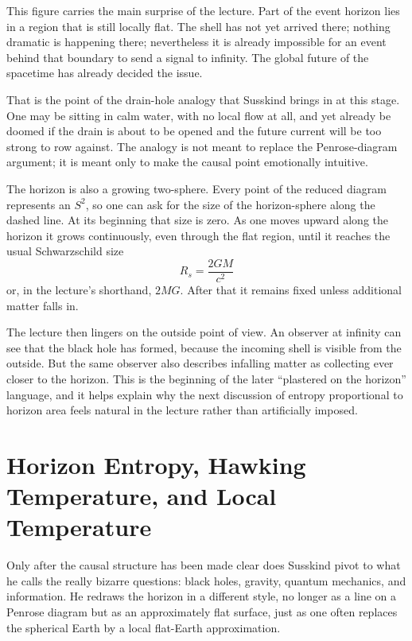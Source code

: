 This figure carries the main surprise of the lecture. Part of the event horizon lies in a region that is still locally flat. The shell has not yet arrived there; nothing dramatic is happening there; nevertheless it is already impossible for an event behind that boundary to send a signal to infinity. The global future of the spacetime has already decided the issue.

That is the point of the drain-hole analogy that Susskind brings in at this stage. One may be sitting in calm water, with no local flow at all, and yet already be doomed if the drain is about to be opened and the future current will be too strong to row against. The analogy is not meant to replace the Penrose-diagram argument; it is meant only to make the causal point emotionally intuitive.

The horizon is also a growing two-sphere. Every point of the reduced diagram represents an \(S^2\), so one can ask for the size of the horizon-sphere along the dashed line. At its beginning that size is zero. As one moves upward along the horizon it grows continuously, even through the flat region, until it reaches the usual Schwarzschild size
\begin{equation}
R_s=\frac{2GM}{c^2}
\end{equation}
or, in the lecture's shorthand, \(2MG\). After that it remains fixed unless additional matter falls in.

The lecture then lingers on the outside point of view. An observer at infinity can see that the black hole has formed, because the incoming shell is visible from the outside. But the same observer also describes infalling matter as collecting ever closer to the horizon. This is the beginning of the later ``plastered on the horizon'' language, and it helps explain why the next discussion of entropy proportional to horizon area feels natural in the lecture rather than artificially imposed.

\section{Horizon Entropy, Hawking Temperature, and Local Temperature}

Only after the causal structure has been made clear does Susskind pivot to what he calls the really bizarre questions: black holes, gravity, quantum mechanics, and information. He redraws the horizon in a different style, no longer as a line on a Penrose diagram but as an approximately flat surface, just as one often replaces the spherical Earth by a local flat-Earth approximation.

